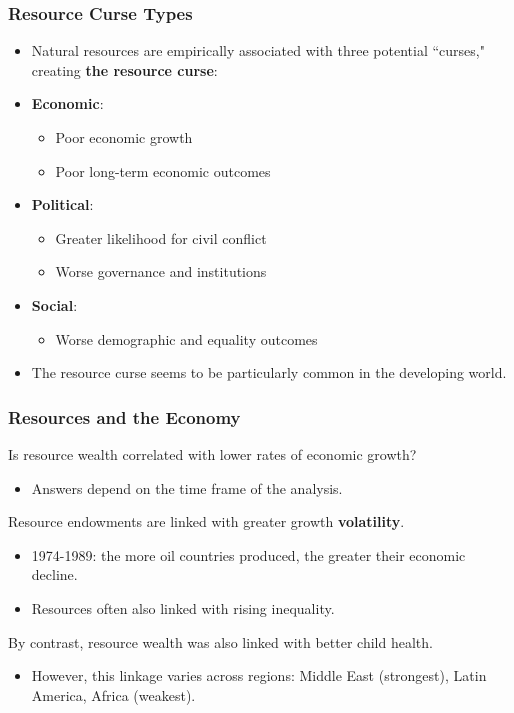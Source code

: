 \documentclass{beamer}
\begin{document}
\begin{frame} 
	\frametitle{\LARGE{Resource Curse Types}}
	\begin{itemize}
		\item Natural resources are empirically associated with three potential ``curses," creating \textbf{the resource curse}: \pause 
		\item \textbf{Economic}: \pause 
		\begin{itemize}
			\item Poor economic growth \pause 
			\item Poor long-term economic outcomes \pause 
		\end{itemize}
		\item \textbf{Political}:  \pause 
		\begin{itemize}
			\item Greater likelihood for civil conflict \pause 
			\item Worse governance and institutions  \pause 
		\end{itemize}
		\item \textbf{Social}:  \pause 
		\begin{itemize}
			\item Worse demographic and equality outcomes  \pause 
		\end{itemize}
		\item The resource curse seems to be particularly common in the developing world.
	\end{itemize}
\end{frame}





\begin{frame} 
	\frametitle{\LARGE{Resources and the Economy}}
	\begin{itemize}
		\large{
			\item Is resource wealth correlated with lower rates of economic growth?  \pause 
			\begin{itemize}
				\item Answers depend on the time frame of the analysis.  \pause 
			\end{itemize}
			\item Resource endowments are linked with greater growth \textbf{volatility}. \pause 
			\begin{itemize}
				\item 1974-1989: the more oil countries produced, the greater their economic decline. \pause 
				\item Resources often also linked with rising inequality. \pause 
			\end{itemize}
			\item By contrast, resource wealth was also linked with better child health. \pause 
			\begin{itemize}
				\item However, this linkage varies across regions: Middle East (strongest), Latin America, Africa (weakest).
			\end{itemize}
		}
	\end{itemize}
\end{frame}
\end{document}
